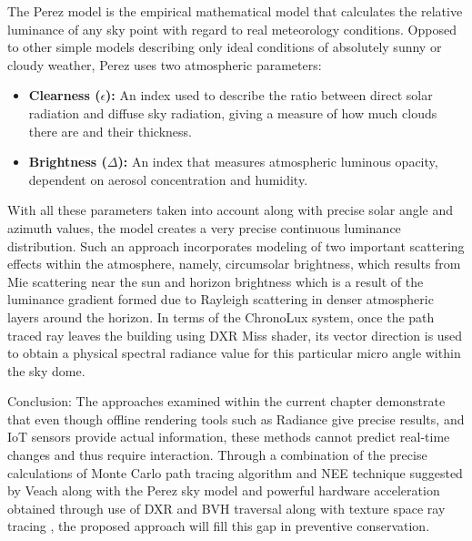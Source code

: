 The Perez model is the empirical mathematical model that calculates the relative luminance of any sky point with regard to real meteorology conditions. Opposed to other simple models describing only ideal conditions of absolutely sunny or cloudy weather, Perez uses two atmospheric parameters:
\begin{itemize}
    \item \textbf{Clearness ($\epsilon$):} An index used to describe the ratio between direct solar radiation and diffuse sky radiation, giving a measure of how much clouds there are and their thickness.
    \item \textbf{Brightness ($\Delta$):} An index that measures atmospheric luminous opacity, dependent on aerosol concentration and humidity.
\end{itemize}

With all these parameters taken into account along with precise solar angle and azimuth values, the model creates a very precise continuous luminance distribution. Such an approach incorporates modeling of two important scattering effects within the atmosphere, namely, circumsolar brightness, which results from Mie scattering near the sun and horizon brightness which is a result of the luminance gradient formed due to Rayleigh scattering in denser atmospheric layers around the horizon. In terms of the ChronoLux system, once the path traced ray leaves the building using DXR Miss shader, its vector direction is used to obtain a physical spectral radiance value for this particular micro angle within the sky dome.

Conclusion: The approaches examined within the current chapter demonstrate that even though offline rendering tools such as Radiance give precise results, and IoT sensors provide actual information, these methods cannot predict real-time changes and thus require interaction. Through a combination of the precise calculations of Monte Carlo path tracing algorithm and NEE technique suggested by Veach \cite{veach1995optimally} along with the Perez sky model \cite{perez1993all}  and powerful hardware acceleration obtained through use of DXR \cite{burgess2020rtx} and BVH traversal along with texture space ray tracing \cite{hasselgren2016texture}, the proposed approach will fill this gap in preventive conservation.